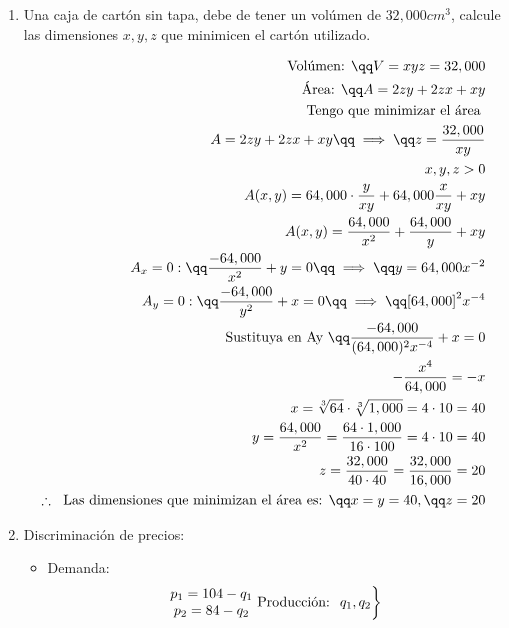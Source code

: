 \begin{enumerate}
    \item Una caja de cartón sin tapa, debe de tener un volúmen de $\displaystyle 32,000 cm^3$, calcule las dimensiones $\displaystyle x,y,z$  que minimicen el cartón utilizado.
        \begin{center}
           \begin{align*}
               \text{ Volúmen: } \qq V = xyz = 32,000 \\ 
               \text{ Área: } \qq A = 2zy+2zx+xy \\ 
               \text{ Tengo que minimizar el área } \\ 
               A = 2zy+2zx+xy \qq \implies \qq z = \frac{32,000}{xy}  \\ 
               x,y,z > 0 \\
               A(x,y) = 64,000 \cdot \frac{y}{xy} + 64,000 \frac{x}{xy} + xy \\ 
               A(x,y) = \frac{64,000}{x^2} + \frac{64,000}{y}   + xy \\ 
               A_x = 0 : \qq \frac{-64,000}{x^2} + y = 0 \qq \implies  \qq y = 64,000x^{-2} \\ 
               A_y = 0 : \qq \frac{-64,000}{y^2} +x = 0 \qq  \implies \qq [64,000]^2x^{-4} \\ 
               \text{ Sustituya en Ay } \qq \frac{-64,000}{(64,000)^2x^{-4}} + x = 0 \\ 
               -\frac{x^4}{64,000}  = -x \\ 
               x = \sqrt[3]{64} \cdot \sqrt[3]{1,000} = 4 \cdot 10 = 40 \\ 
               y = \frac{64,000}{x^2} = \frac{64 \cdot 1,000}{16 \cdot 100} = 4\cdot 10 = 40  \\ 
               z = \frac{32,000}{40 \cdot 40 } = \frac{32,000}{16,000} = 20 \\ 
               \therefore \; \text{ Las dimensiones que minimizan el área es:  } \qq x = y = 40 ,\qq z = 20 \\  
           \end{align*}
        \end{center}
    
    \item Discriminación de precios: 
        \begin{itemize}
            \item Demanda:
                \[
                    \begin{rcases}
                        \begin{matrix}
                            p_1 = 104-q_1 \\ 
                            p_2 = 84-q_2 \\ 
                        \end{matrix} \text{ Producción:  }\; q_1, q_2 
                    \end{rcases}
                \]
            

\end{itemize}
\end{enumerate}
